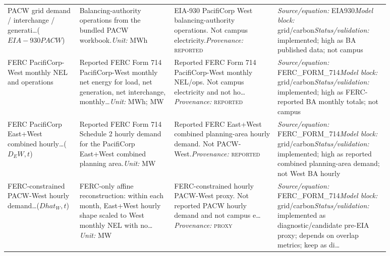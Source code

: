 \documentclass[11pt]{article}
\newcommand{\Reported}{\textsc{reported}}
\newcommand{\Proxy}{\textsc{proxy}}
\begin{document}
\begin{longtable}{@{}p{0.16\linewidth}p{0.22\linewidth}p{0.24\linewidth}p{0.26\linewidth}@{}}
PACW grid demand / interchange / generati\ldots ($EIA-930 PACW$) & Balancing-authority operations from the bundled PACW workbook.\newline \textit{Unit:} MWh & EIA-930 PacifiCorp West balancing-authority operations. Not campus electricity.\newline \textit{Provenance:} \Reported{} & \textit{Source/equation:} EIA930\newline \textit{Model block:} grid/carbon\newline \textit{Status/validation:} implemented; high as BA published data; not campus\\
FERC PacifiCorp-West monthly NEL and operations & Reported FERC Form 714 PacifiCorp-West monthly net energy for load, net generation, net interchange, monthly\ldots\newline \textit{Unit:} MWh; MW & Reported FERC Form 714 PacifiCorp-West monthly NEL/ops. Not campus electricity and not ho\ldots\newline \textit{Provenance:} \Reported{} & \textit{Source/equation:} FERC\_FORM\_714\newline \textit{Model block:} grid/carbon\newline \textit{Status/validation:} implemented; high as FERC-reported BA monthly totals; not campus\\
FERC PacifiCorp East+West combined hourly\ldots ($D_EW,t$) & Reported FERC Form 714 Schedule 2 hourly demand for the PacifiCorp East+West combined planning area.\newline \textit{Unit:} MW & Reported FERC East+West combined planning-area hourly demand. Not PACW-West.\newline \textit{Provenance:} \Reported{} & \textit{Source/equation:} FERC\_FORM\_714\newline \textit{Model block:} grid/carbon\newline \textit{Status/validation:} implemented; high as reported combined planning-area demand; not West BA hourly\\
FERC-constrained PACW-West hourly demand\ldots ($Dhat_W,t$) & FERC-only affine reconstruction: within each month, East+West hourly shape scaled to West monthly NEL with no\ldots\newline \textit{Unit:} MW & FERC-constrained hourly PACW-West proxy. Not reported PACW hourly demand and not campus e\ldots\newline \textit{Provenance:} \Proxy{} & \textit{Source/equation:} FERC\_FORM\_714\newline \textit{Model block:} grid/carbon\newline \textit{Status/validation:} implemented as diagnostic/candidate pre-EIA proxy; depends on overlap metrics; keep as di\ldots\\

\end{longtable}
\end{document}
